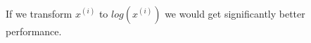 \begin{answer}\\
If we transform $x^{(i)}$ to $log(x^{(i)})$ we would get significantly better performance.\\
\end{answer}
